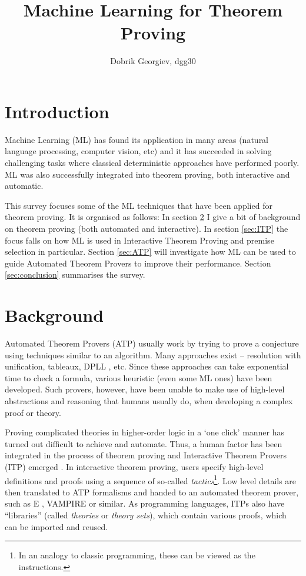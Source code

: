 \documentclass{article}
\title{Machine Learning for Theorem Proving}
\author{Dobrik Georgiev, dgg30}
\begin{document}
\maketitle
\section{Introduction}

Machine Learning (ML) has found its application in many areas (natural language
processing, computer vision, etc) and it has succeeded in solving challenging
tasks where classical deterministic approaches have performed poorly. ML was
also successfully integrated into theorem proving, both interactive and
automatic. 

This survey focuses some of the ML techniques that have been applied for
theorem proving. It is organised as follows:
In section \ref{sec:background} I give a bit of background on theorem proving
(both automated and interactive). In section \ref{sec:ITP} the focus falls on
how ML is used in Interactive Theorem Proving and premise selection in
particular. Section \ref{sec:ATP} will investigate how ML can be used to guide
Automated Theorem Provers to improve their performance. Section
\ref{sec:conclusion} summarises the survey.


\section{Background}\label{sec:background}

Automated Theorem Provers (ATP) usually work by trying to prove a conjecture
using techniques similar to an algorithm. Many approaches exist -- resolution
with unification, tableaux, DPLL \citep{DPLL}, etc. Since these approaches can
take exponential time to check a formula, various heuristic (even some ML ones)
have been developed. Such provers, however, have been unable to make use of
high-level abstractions and reasoning that humans usually do, when developing
a complex proof or theory.

Proving complicated theories in higher-order logic in a `one click' manner has
turned out difficult to achieve and automate. Thus, a human factor has been
integrated in the process of theorem proving and Interactive Theorem Provers
(ITP) emerged \citep{HistoryITP}. In interactive theorem proving, users specify
high-level definitions and proofs using a sequence of so-called
\textit{tactics}\footnote{In an analogy to classic programming, these can be
viewed as the instructions.}. Low level details are then translated to ATP
formalisms and handed to an automated theorem prover, such as
E \citep{Eprover}, VAMPIRE \citep{VAMPIRE} or similar. As programming
languages, ITPs also have ``libraries'' (called \emph{theories} or \emph{theory
sets}), which contain various proofs, which can be imported and reused.
\end{document}
